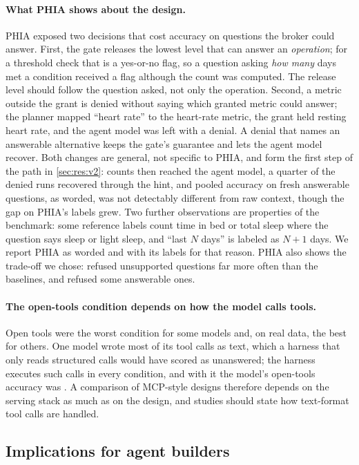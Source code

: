 \paragraph{What PHIA shows about the design.} PHIA exposed two decisions that cost accuracy on questions the broker
could answer. First, the gate releases the lowest level that can answer an \emph{operation}; for a threshold check
that is a yes-or-no flag, so a question asking \emph{how many} days met a condition received a flag although the
count was computed. The release level should follow the question asked, not only the operation. Second, a metric
outside the grant is denied without saying which granted metric could answer; the planner mapped ``heart rate'' to
the heart-rate metric, the grant held resting heart rate, and the agent model was left with a denial. A denial that
names an answerable alternative keeps the gate's guarantee and lets the agent model recover. Both changes are
general, not specific to PHIA, and form the first step of the path in \cref{sec:res:v2}: counts then reached the
agent model, a quarter of the denied runs recovered through the hint, and pooled accuracy on fresh answerable
questions, as worded, was not detectably different from raw context, though the gap on PHIA's labels grew. Two further observations are properties of the benchmark: some reference labels count time in bed or total
sleep where the question says sleep or light sleep, and ``last $N$ days'' is labeled as $N{+}1$ days. We report
PHIA as worded and with its labels for that reason. PHIA also shows the trade-off we chose: \sys{} refused
unsupported questions far more often than the baselines, and refused some answerable ones.

\paragraph{The open-tools condition depends on how the model calls tools.} Open tools were the worst condition for
some models and, on real data, the best for others. One model wrote most of its tool calls as text, which a harness that only
reads structured calls would have scored as unanswered; the harness executes such calls in every condition, and
with it the model's open-tools accuracy was \accLlamaScoutB{}. A comparison of MCP-style designs therefore depends on the serving stack as much as on the design,
and studies should state how text-format tool calls are handled.

\subsection{Implications for agent builders}


